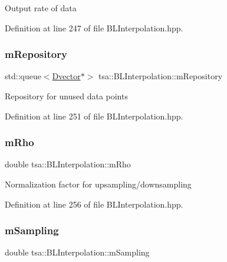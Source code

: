 Output rate of data 

Definition at line 247 of file B\+L\+Interpolation.\+hpp.

\mbox{\label{classtsa_1_1_b_l_interpolation_ab7b685a2b64f9139ca4ea3907f6b0a07}} 
\subsubsection{\texorpdfstring{m\+Repository}{mRepository}}
{\footnotesize\ttfamily std\+::queue$<$\hyperlink{namespacetsa_a8900fb03d849baf447a1a0efe2561fb2}{Dvector}$\ast$$>$ tsa\+::\+B\+L\+Interpolation\+::m\+Repository\hspace{0.3cm}{\ttfamily [private]}}

Repository for unused data points 

Definition at line 251 of file B\+L\+Interpolation.\+hpp.

\mbox{\label{classtsa_1_1_b_l_interpolation_a21a038009c7323c00263367ca678f767}} 
\subsubsection{\texorpdfstring{m\+Rho}{mRho}}
{\footnotesize\ttfamily double tsa\+::\+B\+L\+Interpolation\+::m\+Rho\hspace{0.3cm}{\ttfamily [private]}}

Normalization factor for upsampling/downsampling 

Definition at line 256 of file B\+L\+Interpolation.\+hpp.

\mbox{\label{classtsa_1_1_b_l_interpolation_a76258e5da0c92a792af987a3f2cf972d}} 
\subsubsection{\texorpdfstring{m\+Sampling}{mSampling}}
{\footnotesize\ttfamily double tsa\+::\+B\+L\+Interpolation\+::m\+Sampling\hspace{0.3cm}{\ttfamily [private]}}

